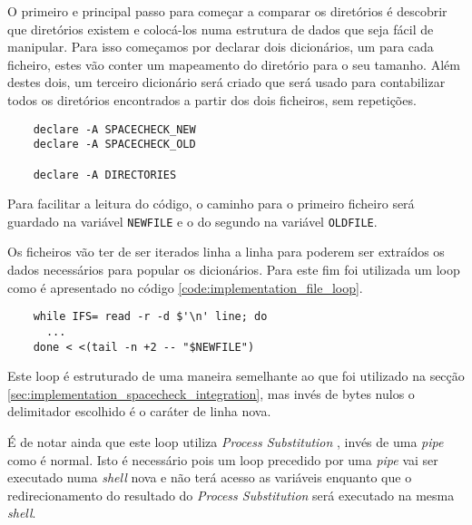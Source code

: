 O primeiro e principal passo para começar a comparar os diretórios é descobrir
que diretórios existem e colocá-los numa estrutura de dados que seja fácil de
manipular. Para isso começamos por declarar dois dicionários, um para cada
ficheiro, estes vão conter um mapeamento do diretório para o seu tamanho.
Além destes dois, um terceiro dicionário será criado que será usado para
contabilizar todos os diretórios encontrados a partir dos dois ficheiros,
sem repetições.

\begin{listing}[H]
	\centering
	\begin{verbatim}
    declare -A SPACECHECK_NEW
    declare -A SPACECHECK_OLD

    declare -A DIRECTORIES
  \end{verbatim}
	\cprotect\caption{Declaração dos dicionários usados no \Verb|spacerate.sh|}
\end{listing}

Para facilitar a leitura do código, o caminho para o primeiro ficheiro será
guardado na variável \Verb|NEWFILE| e o do segundo na variável
\Verb|OLDFILE|.

Os ficheiros vão ter de ser iterados linha a linha para poderem ser extraídos os
dados necessários para popular os dicionários. Para este fim foi utilizada um
loop  como é apresentado no código
\ref{code:implementation_file_loop}.

\begin{listing}[H]
	\centering
	\begin{verbatim}
    while IFS= read -r -d $'\n' line; do
      ...
    done < <(tail -n +2 -- "$NEWFILE")
  \end{verbatim}
	\cprotect\caption{Iteração sobre o ficheiro do \Verb|spacecheck.sh|}
	\label{code:implementation_file_loop}
\end{listing}

Este loop é estruturado de uma maneira semelhante ao que foi utilizado na secção
\ref{sec:implementation_spacecheck_integration}, mas invés de bytes nulos o
delimitador escolhido é o caráter de linha nova.

É de notar ainda que este loop utiliza \emph{Process Substitution}
\cite{bash_man}, invés de uma \emph{pipe} como é normal. Isto é necessário pois
um loop  precedido por uma \emph{pipe} vai ser executado numa
\emph{shell} nova e não terá acesso as variáveis enquanto que o redirecionamento
do resultado do \emph{Process Substitution} será executado na mesma
\emph{shell}.

